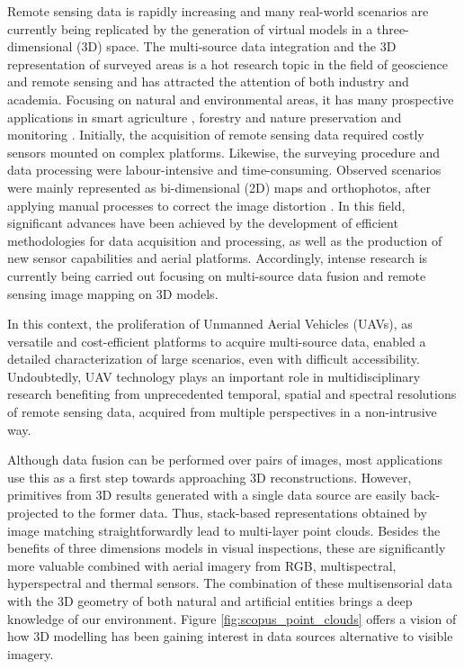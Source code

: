 Remote sensing data is rapidly increasing and many real-world scenarios are currently being replicated by the generation of virtual models in a three-dimensional (3D) space. The multi-source data integration and the 3D representation of surveyed areas is a hot research topic in the field of geoscience and remote sensing and has attracted the attention of both industry and academia. Focusing on natural and environmental areas, it has many prospective applications in smart agriculture \cite{jurado_multispectral_2020, padua_vineyard_2019, poblete_discriminating_2021}, forestry and nature preservation \cite{almeida_monitoring_2021, guimaraes_forestry_2020, heckel_predicting_2020, schiefer_mapping_2020} and monitoring \cite{maimaitijiang_crop_2020}. Initially, the acquisition of remote sensing data required costly sensors mounted on complex platforms. Likewise, the surveying procedure and data processing were labour-intensive and time-consuming. Observed scenarios were mainly represented as bi-dimensional (2D) maps and orthophotos, after applying manual processes to correct the image distortion \cite{vong_how_2021}. In this field, significant advances have been achieved by the development of efficient methodologies for data acquisition and processing, as well as the production of new sensor capabilities and aerial platforms. Accordingly, intense research is currently being carried out focusing on multi-source data fusion and remote sensing image mapping on 3D models.

In this context, the proliferation of Unmanned Aerial Vehicles (UAVs), as versatile and cost-efficient platforms to acquire multi-source data, enabled a detailed characterization of large scenarios, even with difficult accessibility. Undoubtedly, UAV technology plays an important role in multidisciplinary research benefiting from unprecedented temporal, spatial and spectral resolutions of remote sensing data, acquired from multiple perspectives in a non-intrusive way.

Although data fusion can be performed over pairs of images, most applications use this as a first step towards approaching 3D reconstructions. However, primitives from 3D results generated with a single data source are easily back-projected to the former data. Thus, stack-based representations obtained by image matching straightforwardly lead to multi-layer point clouds. Besides the benefits of three dimensions models in visual inspections, these are significantly more valuable combined with aerial imagery from RGB, multispectral, hyperspectral and thermal sensors. The combination of these multisensorial data with the 3D geometry of both natural and artificial entities brings a deep knowledge of our environment. Figure \ref{fig:scopus_point_clouds} offers a vision of how 3D modelling has been gaining interest in data sources alternative to visible imagery.

